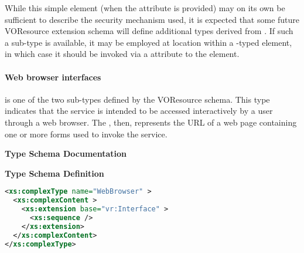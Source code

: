 \documentclass[11pt,a4paper]{ivoa}
\begin{document}
While this simple element (when the  attribute
is provided) may on its own be sufficient to describe the security
mechanism used, it is expected that some future
VOResource extension schema will define
additional types derived from .  If such
a sub-type is available, it may be employed at
 location within a
-typed element, in which case it should be
invoked via a  attribute to the
 element.


\paragraph{Web browser interfaces}

 is one of the two 
sub-types defined by the VOResource schema.  This type indicates that
the service is intended to be accessed interactively by a user through
a web browser.  The , then, represents
the URL of a web page containing one or more forms used to invoke the
service.


\begin{generated}
\begingroup
        \renewcommand*\descriptionlabel[1]{%
        \hbox to 5.5em{\emph{#1}\hfil}}\vspace{2ex}\noindent\textbf{ Type Schema Documentation}



\vspace{1ex}\noindent\textbf{ Type Schema Definition}

\begin{lstlisting}[language=XML,basicstyle=\footnotesize]
<xs:complexType name="WebBrowser" >
  <xs:complexContent >
    <xs:extension base="vr:Interface" >
      <xs:sequence />
    </xs:extension>
  </xs:complexContent>
</xs:complexType>
\end{lstlisting}\endgroup
\end{generated}

\end{document}
